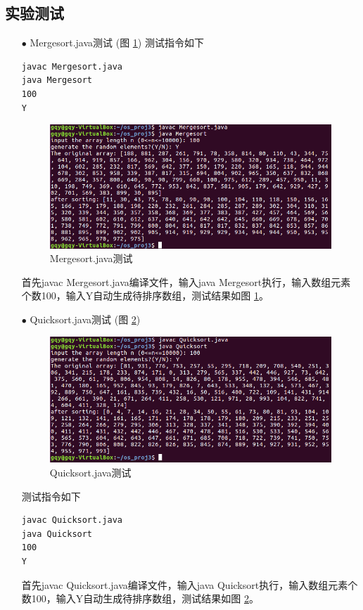 \documentclass{article}
\begin{document}
\subsection{实验测试}
\begin{itemize}
\item[$\bullet$]Mergesort.java测试 (图 \ref{Mergesort.java测试})
测试指令如下
\begin{lstlisting}[language={[ANSI]C}]
javac Mergesort.java
java Mergesort
100
Y
\end{lstlisting}
\begin{figure}[htbp]
		\centering
		\includegraphics{ms}
		\caption{Mergesort.java测试} \label{Mergesort.java测试}
\end{figure}
首先javac Mergesort.java编译文件，输入java Mergesort执行，输入数组元素个数100，输入Y自动生成待排序数组，测试结果如图 \ref{Mergesort.java测试}。

\item[$\bullet$]Quicksort.java测试 (图 \ref{Quicksort.java测试})
\begin{figure}[htbp]
		\centering
		\includegraphics{qs}
		\caption{Quicksort.java测试} \label{Quicksort.java测试}
\end{figure}

测试指令如下
\begin{lstlisting}[language={[ANSI]C}]
javac Quicksort.java
java Quicksort
100
Y
\end{lstlisting}
首先javac Quicksort.java编译文件，输入java Quicksort执行，输入数组元素个数100，输入Y自动生成待排序数组，测试结果如图 \ref{Quicksort.java测试}。
\end{itemize}
\end{document}

